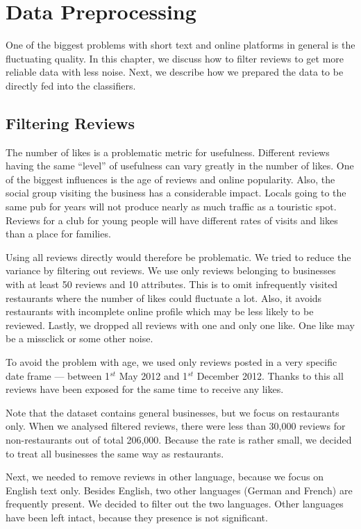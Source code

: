 \chapter{Data Preprocessing}\label{app:prepr}

One of the biggest problems with short text and online platforms in general is
the fluctuating quality.
In this chapter, we discuss how to filter reviews to get more reliable data with
less noise.
Next, we describe how we prepared the data to be directly fed into the classifiers.


\section{Filtering Reviews}

The number of likes is a problematic metric for usefulness.
Different reviews having the same ``level'' of usefulness can vary greatly
in the number of likes.
One of the biggest influences is the age of reviews and online popularity.
Also, the social group visiting the business has a considerable impact.
Locals going to the same pub for years will not produce nearly as much traffic
as a touristic spot.
Reviews for a club for young people will have different rates of visits and likes
than a place for families.

Using all reviews directly would therefore be problematic.
We tried to reduce the variance by filtering out reviews.
We use only reviews belonging to businesses with at least 50 reviews and 10 attributes.
This is to omit infrequently visited restaurants where the number of likes could fluctuate a lot.
Also, it avoids restaurants with incomplete online profile which may be less likely to be reviewed.
Lastly, we dropped all reviews with one and only one like.
One like may be a missclick or some other noise.

To avoid the problem with age, we used only reviews posted in a very specific date frame
--- between 1$^{st}$ May 2012 and 1$^{st}$ December 2012.
Thanks to this all reviews have been exposed for the same time to receive any likes.

Note that the dataset contains general businesses, but we focus on restaurants only.
When we analysed filtered reviews,
there were less than 30,000 reviews for non-restaurants out of total 206,000.
Because the rate is rather small,
we decided to treat all businesses the same way as restaurants.

Next, we needed to remove reviews in other language, because
we focus on English text only.
Besides English, two other languages (German and French) are frequently present.
We decided to filter out the two languages.
Other languages have been left intact, because they presence is not significant.

